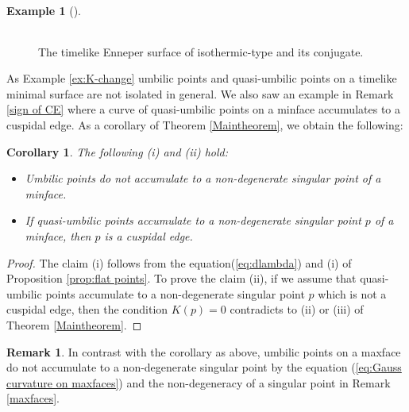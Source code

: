 \documentclass[11pt,reqno]{amsart}
\theoremstyle{plain} %
\newtheorem{corollary}[theorem]{Corollary}
\theoremstyle{definition}
\newtheorem{remark}[theorem]{Remark}
\newtheorem{example}[theorem]{Example}
\begin{document}
\begin{example}[\cite{IT, Konderak,T}]
\begin{figure}[!h]
\begin{center}
\begin{tabular}{c}
\end{tabular}
\end{center}
\vspace{-0.5cm}
\caption{The timelike Enneper surface of isothermic-type and its conjugate.}\label{Fig5}

\end{figure}


\end{example}
As Example \ref{ex:K-change} umbilic points and quasi-umbilic points on a timelike minimal surface are not isolated in general. We also saw an example in Remark \ref{sign of CE} where a curve of quasi-umbilic points on a minface accumulates to a cuspidal edge. As a corollary of Theorem \ref{Maintheorem}, we obtain the following:

\begin{corollary}\label{Cor: accumulate points}
The following (i) and (ii) hold:
\begin{itemize}
\item[(i)] Umbilic points do not accumulate to a non-degenerate singular point of a minface.
\item[(ii)] If quasi-umbilic points accumulate to a non-degenerate singular point $p$ of a minface, then $p$ is a cuspidal edge.
\end{itemize}
\end{corollary}
\begin{proof}
The claim (i) follows from the equation(\ref{eq:dlambda}) and (i) of Proposition \ref{prop:flat points}. To prove the claim (ii), if we assume that quasi-umbilic points accumulate to a non-degenerate singular point $p$ which is not a cuspidal edge, then the condition $K(p)=0$ contradicts to (ii) or (iii) of Theorem \ref{Maintheorem}.
\end{proof}
\begin{remark}
In contrast with the corollary as above, umbilic points on a maxface do not accumulate to a non-degenerate singular point by the equation (\ref{eq:Gauss curvature on maxfaces}) and the non-degeneracy of a singular point in Remark \ref{maxfaces}.
\end{remark}
\end{document}
